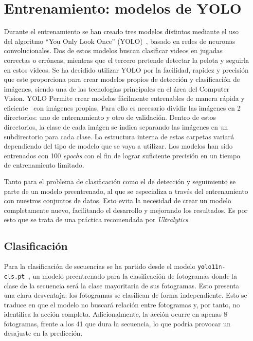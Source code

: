 \documentclass[12pt]{report} %
\begin{document}
    \section{Entrenamiento: modelos de YOLO}

    Durante el entrenamiento se han creado tres modelos distintos mediante el
    uso del algoritmo ``You Only Look Once'' (YOLO)~\cite{YOLO}, basado en redes de
    neuronas convolucionales. Dos de estos modelos buscan clasificar videos en
    jugadas correctas o erróneas, mientras que el tercero pretende detectar la
    pelota y seguirla en estos videos. Se ha decidido utilizar YOLO por la
    facilidad, rapidez y precisión que este proporciona para crear modelos
    propios de detección y clasificación de imágenes, siendo una de las
    tecnologías principales en el área del Computer Vision. YOLO Permite crear
    modelos fácilmente entrenables de manera rápida y eficiente~\cite{YoloUltralytics}
    con imágenes propias. Para ello es necesario dividir las imágenes en 2
    directorios: uno de entrenamiento y otro de validación. Dentro de estos
    directorios, la clase de cada imágen se indica separando las imágenes en un
    subdirectorio para cada clase. La estructura interna de estas carpetas
    variará dependiendo del tipo de modelo que se vaya a utilizar. Los modelos
    han sido entrenados con 100 \textit{epochs} con el fin de lograr suficiente
    precisión en un tiempo de entrenamiento limitado.

    Tanto para el problema de clasificación como el de detección y seguimiento
    se parte de un modelo preentrenado, al que se especializa a través del
    entrenamiento con nuestros conjuntos de datos. Esto evita la necesidad de
    crear un modelo completamente nuevo, facilitando el desarrollo y mejorando
    los resultados. Es por esto que se trata de una práctica recomendada por
    \textit{Ultralytics}.

    \subsection{Clasificación}
    Para la clasificación de secuencias se ha partido desde el modelo
    \texttt{yolo11n-cls.pt}~\cite{yolo11n-csl}, un modelo preentrenado para la
    clasificación de fotogramas donde la clase de la secuencia será la clase
    mayoritaria de sus fotogramas. Esto presenta una clara desventaja: los
    fotogramas se clasifican de forma independiente. Esto se traduce en que el
    modelo no buscará relación entre fotogramas y, por tanto, no identifica la
    acción completa. Adicionalmente, la acción ocurre en apenas 8 fotogramas,
    frente a los 41 que dura la secuencia, lo que podría provocar un desajuste
    en la predicción.
    
\end{document}
